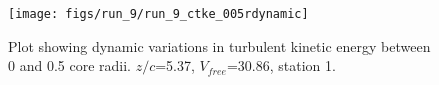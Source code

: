 \begin{figure}[H]
\centering
\texttt{[image: figs/run\_9/run\_9\_ctke\_005rdynamic]}
\caption{Plot showing dynamic variations in turbulent kinetic energy between 0 and 0.5 core radii. $z/c$=5.37, $V_{free}$=30.86, station 1.}
\label{fig:run_9_ctke_005rdynamic}
\end{figure}


